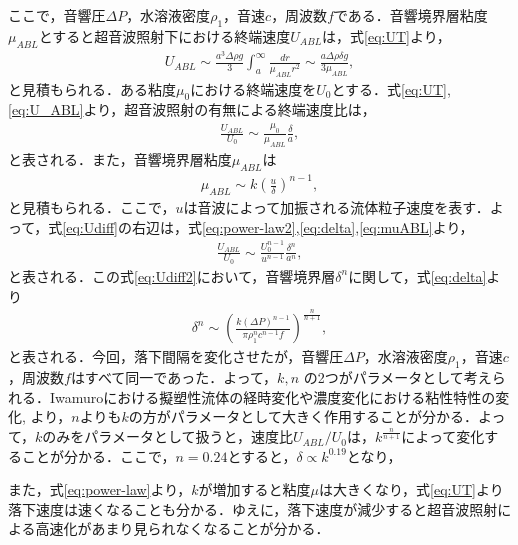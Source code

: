ここで，音響圧$\Delta P$，水溶液密度$\rho_1$，音速$c$，周波数$f$である．音響境界層粘度$\mu_{ABL}$とすると超音波照射下における終端速度$U_{ABL}$は，式\ref{eq:UT}より，
\begin{eqnarray}
    U_{ABL} \sim \frac{a^3\Delta\rho g}{3}  \int^{\infty}_{a} \frac{dr}{\mu_{ABL} r^2} \sim \frac{a\Delta \rho \delta g}{3\mu_{ABL}} ,
    \label{eq:U_ABL}
\end{eqnarray}
と見積もられる．ある粘度$\mu_0$における終端速度を$U_0$とする．式\ref{eq:UT},\ref{eq:U_ABL}より，超音波照射の有無による終端速度比は，
\begin{eqnarray}
    \frac{U_{ABL}}{U_0} \sim \frac{\mu_0}{\mu_{ABL}}\frac{\delta}{a} ,
    \label{eq:Udiff}
\end{eqnarray}
と表される．また，音響境界層粘度$\mu_{ABL}$は
\begin{eqnarray}
    \mu_{ABL} \sim k\left(\frac{u}{\delta}\right)^{n-1} ,
    \label{eq:muABL}
\end{eqnarray}
と見積もられる．ここで，$u$は音波によって加振される流体粒子速度を表す．よって，式\ref{eq:Udiff}の右辺は，式\ref{eq:power-law2},\ref{eq:delta},\ref{eq:muABL}より，
\begin{eqnarray}
    \frac{U_{ABL}}{U_0} \sim \frac{U_0^{n-1}}{u^{n-1}}\frac{\delta^n}{a^n} ,
    \label{eq:Udiff2}
\end{eqnarray}
と表される．この式\ref{eq:Udiff2}において，音響境界層$\delta^n$に関して，式\ref{eq:delta}より
\begin{eqnarray}
    \delta^n \sim \left(\frac{k\left(\Delta P\right)^{n-1}}{\pi \rho^n_1 c^{n-1} f}\right)^{\frac{n}{n+1}} ,
    \label{eq:ndelta}
\end{eqnarray}
と表される．今回，落下間隔を変化させたが，音響圧$\Delta P$，水溶液密度$\rho_1$，音速$c$，周波数$f$はすべて同一であった．よって，$k,n$ の2つがパラメータとして考えられる．Iwamuro\cite{ref:9}における擬塑性流体の経時変化や濃度変化における粘性特性の変化\cite{ref:Rahimi2007},\cite{ref:Agi2018} より，$n$よりも$k$の方がパラメータとして大きく作用することが分かる．よって，$k$のみをパラメータとして扱うと，速度比$U_{ABL}/U_0$は，$k^\frac{n}{n+1}$によって変化することが分かる．ここで，$n=0.24$とすると，$\delta \propto k^{0.19}$となり，








また，式\ref{eq:power-law}より，$k$が増加すると粘度$\mu$は大きくなり，式\ref{eq:UT}より落下速度は速くなることも分かる．ゆえに，落下速度が減少すると超音波照射による高速化があまり見られなくなることが分かる．

